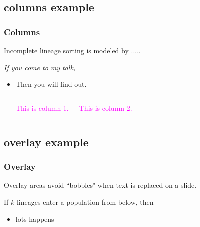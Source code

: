 \documentclass[presentation]{beamer}
\theoremstyle{plain}
\theoremstyle{definition}
\begin{document}
\subsection{columns example}

\begin{frame}
\frametitle{Columns}

Incomplete lineage sorting is modeled by  .....

\medskip

\centerline{\textcolor{myred}{\large \emph{If you come to my talk,}}}

\begin{itemize}

\item Then you will find out.

\bigskip

\begin{columns}

\column{.1cm}

\column{4.5cm} \textcolor{magenta}{This is column 1.}

\column{1.9cm} \textcolor{magenta}{This is column 2.}
\column{1cm}
\thinspace \ 
\end{columns}

\end{itemize}

\end{frame}

\subsection{overlay example}

\begin{frame}
\frametitle{Overlay}

\begin{overlayarea}{\textwidth}{3cm}
\begin{minipage}{3cm}

\end{minipage}
\begin{minipage}{.5cm}
\qquad
\end{minipage}
\begin{minipage}{7cm}
Overlay areas avoid ``bobbles" when text is replaced on a slide.

\medskip 

\end{minipage}

\bigskip

\end{overlayarea}

If $k$ lineages enter a population from below, then 

\begin{itemize}

\item lots happens
 

\end{itemize}

\end{frame}
\end{document}
